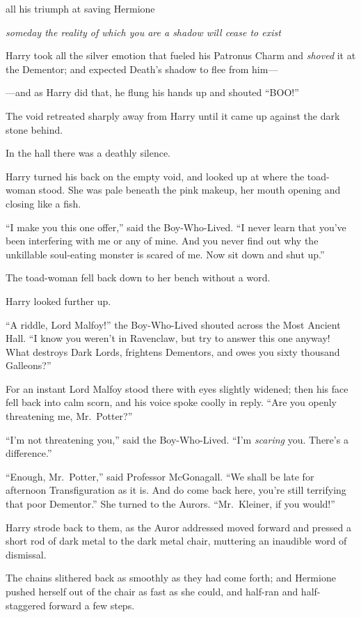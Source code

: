 all his triumph at saving Hermione

\emph{someday the reality of which you are a shadow will cease to exist}

Harry took all the silver emotion that fueled his Patronus Charm and
\emph{shoved} it at the Dementor; and expected Death's shadow to flee
from him---

---and as Harry did that, he flung his hands up and shouted ``BOO!''

The void retreated sharply away from Harry until it came up against the
dark stone behind.

In the hall there was a deathly silence.

Harry turned his back on the empty void, and looked up at where the
toad-woman stood. She was pale beneath the pink makeup, her mouth
opening and closing like a fish.

``I make you this one offer,'' said the Boy-Who-Lived. ``I never learn
that you've been interfering with me or any of mine. And you never find
out why the unkillable soul-eating monster is scared of me. Now sit down
and shut up.''

The toad-woman fell back down to her bench without a word.

Harry looked further up.

``A riddle, Lord Malfoy!'' the Boy-Who-Lived shouted across the Most
Ancient Hall. ``I know you weren't in Ravenclaw, but try to answer this
one anyway! What destroys Dark Lords, frightens Dementors, and owes you
sixty thousand Galleons?''

For an instant Lord Malfoy stood there with eyes slightly widened; then
his face fell back into calm scorn, and his voice spoke coolly in reply.
``Are you openly threatening me, Mr.~Potter?''

``I'm not threatening you,'' said the Boy-Who-Lived. ``I'm
\emph{scaring} you. There's a difference.''

``Enough, Mr.~Potter,'' said Professor McGonagall. ``We shall be late
for afternoon Transfiguration as it is. And do come back here, you're
still terrifying that poor Dementor.'' She turned to the Aurors.
``Mr.~Kleiner, if you would!''

Harry strode back to them, as the Auror addressed moved forward and
pressed a short rod of dark metal to the dark metal chair, muttering an
inaudible word of dismissal.

The chains slithered back as smoothly as they had come forth; and
Hermione pushed herself out of the chair as fast as she could, and
half-ran and half-staggered forward a few steps.

